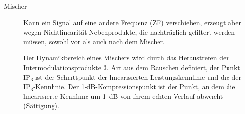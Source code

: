 \begin{description}
\item[Mischer] Kann ein Signal auf eine andere Frequenz (ZF) verschieben, erzeugt aber wegen Nichtlinearität Nebenprodukte, die nachträglich gefiltert werden müssen, sowohl vor als auch nach dem Mischer.
\begin{center}
\begin{tikzpicture}[scale=0.4, every node/.style={scale=0.7}]

\end{tikzpicture}
\end{center}
\begin{center}
\begin{tikzpicture}[scale=1, every node/.style={scale=1}]

\end{tikzpicture}
\end{center}
Der Dynamikbereich eines Mischers wird durch das Heraustreten der Intermodulationsprodukte 3. Art aus dem Rauschen definiert, der Punkt $\text{IP}_3$ ist der Schnittpunkt der linearisierten Leistungskennlinie und die der $\text{IP}_3$-Kennlinie. Der 1-dB-Kompressionspunkt ist der Punkt, an dem die linearisierte Kennlinie um \SI{1}{\dB} von ihrem echten Verlauf abweicht (Sättigung).
\begin{center}
\begin{tikzpicture}[scale=1, every node/.style={scale=1}]

\end{tikzpicture}
\end{center}
\end{description}